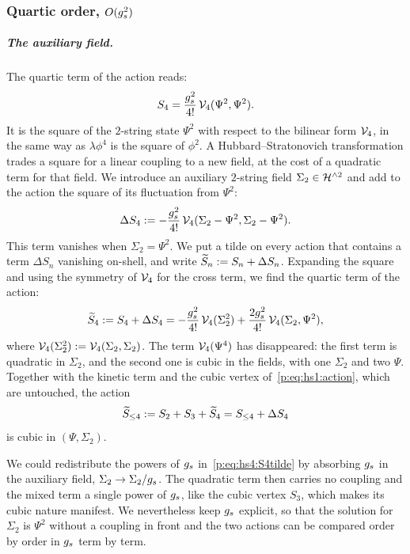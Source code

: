 \subsubsection{Quartic order, \texorpdfstring{$O(\gs^2)$}{O(gs**2)}}
\label{p:sec:hs:quartic}


\subparagraph{The auxiliary field.}

The quartic term of the action reads:
\begin{equation}
  S_4
    = \frac{\gs^2}{4!} \, \vertex{4}(\Psi^2, \Psi^2).
\end{equation}
It is the square of the $2$-string state $\Psi^2$ with respect to the bilinear form $\vertex{4}$, in the same way as $\lambda \phi^4$ is the square of $\phi^2$.
A Hubbard--Stratonovich transformation trades a square for a linear coupling to a new field, at the cost of a quadratic term for that field.
We introduce an auxiliary $2$-string field $\Sigma_2 \in \Hn{2}$ and add to the action the square of its fluctuation from $\Psi^2$:
\begin{equation}
  \label{p:eq:hs4:DeltaS4}
  \Delta S_4
    := - \frac{\gs^2}{4!} \, \vertex{4}(\Sigma_2 - \Psi^2, \Sigma_2 - \Psi^2).
\end{equation}
This term vanishes when $\Sigma_2 = \Psi^2$.
We put a tilde on every action that contains a term $\Delta S_n$ vanishing on-shell, and write $\caction[n] := S_n + \Delta S_n$.
Expanding the square and using the symmetry of $\vertex{4}$ for the cross term, we find the quartic term of the action:
\begin{equation}
  \label{p:eq:hs4:S4tilde}
  \caction[4]
    := S_4 + \Delta S_4
    = - \frac{\gs^2}{4!} \, \vertex{4}(\Sigma_2^2)
      + \frac{2 \gs^2}{4!} \, \vertex{4}(\Sigma_2, \Psi^2),
\end{equation}
where $\vertex{4}(\Sigma_2^2) := \vertex{4}(\Sigma_2, \Sigma_2)$.
The term $\vertex{4}(\Psi^4)$ has disappeared: the first term is quadratic in $\Sigma_2$, and the second one is cubic in the fields, with one $\Sigma_2$ and two $\Psi$.
Together with the kinetic term and the cubic vertex of~\eqref{p:eq:hs1:action}, which are untouched, the action
\begin{equation}
  \label{p:eq:hs4:action-tilde}
  \caction[\le 4]
    := S_2 + S_3 + \caction[4]
    = S_{\le 4} + \Delta S_4
\end{equation}
is cubic in $(\Psi, \Sigma_2)$.

We could redistribute the powers of $\gs$ in~\eqref{p:eq:hs4:S4tilde} by absorbing $\gs$ in the auxiliary field, $\Sigma_2 \to \Sigma_2 / \gs$.
The quadratic term then carries no coupling and the mixed term a single power of $\gs$, like the cubic vertex $S_3$, which makes its cubic nature manifest.
We nevertheless keep $\gs$ explicit, so that the solution for $\Sigma_2$ is $\Psi^2$ without a coupling in front and the two actions can be compared order by order in $\gs$ term by term.


